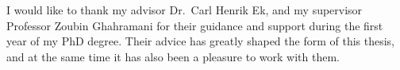 
\begin{acknowledgements}      


I would like to thank my advisor Dr.~Carl Henrik Ek, and my supervisor Professor Zoubin Ghahramani for their guidance and support during the first year of my PhD degree. Their advice has greatly shaped the form of this thesis, and at the same time it has also been a pleasure to work with them.




\end{acknowledgements}
